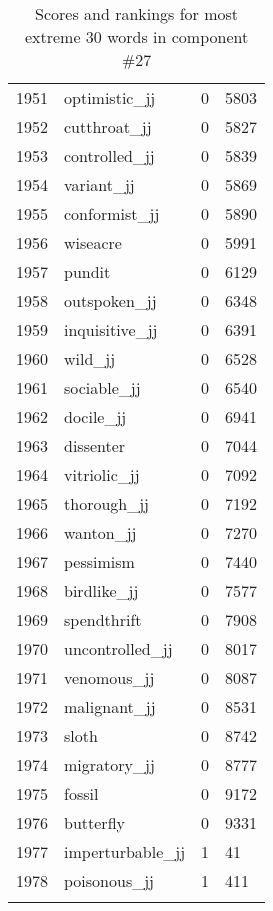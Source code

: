\begin{longtable}[!htbp]{| rlr@{.}l |}
    1951 & optimistic\_jj & 0 & 5803 \\
    1952 & cutthroat\_jj & 0 & 5827 \\
    1953 & controlled\_jj & 0 & 5839 \\
    1954 & variant\_jj & 0 & 5869 \\
    1955 & conformist\_jj & 0 & 5890 \\
    1956 & wiseacre & 0 & 5991 \\
    1957 & pundit & 0 & 6129 \\
    1958 & outspoken\_jj & 0 & 6348 \\
    1959 & inquisitive\_jj & 0 & 6391 \\
    1960 & wild\_jj & 0 & 6528 \\
    1961 & sociable\_jj & 0 & 6540 \\
    1962 & docile\_jj & 0 & 6941 \\
    1963 & dissenter & 0 & 7044 \\
    1964 & vitriolic\_jj & 0 & 7092 \\
    1965 & thorough\_jj & 0 & 7192 \\
    1966 & wanton\_jj & 0 & 7270 \\
    1967 & pessimism & 0 & 7440 \\
    1968 & birdlike\_jj & 0 & 7577 \\
    1969 & spendthrift & 0 & 7908 \\
    1970 & uncontrolled\_jj & 0 & 8017 \\
    1971 & venomous\_jj & 0 & 8087 \\
    1972 & malignant\_jj & 0 & 8531 \\
    1973 & sloth & 0 & 8742 \\
    1974 & migratory\_jj & 0 & 8777 \\
    1975 & fossil & 0 & 9172 \\
    1976 & butterfly & 0 & 9331 \\
    1977 & imperturbable\_jj & 1 & 41 \\
    1978 & poisonous\_jj & 1 & 411 \\
    \hline
    \caption{Scores and rankings for most extreme 30 words in component \#27} \\
\end{longtable}
